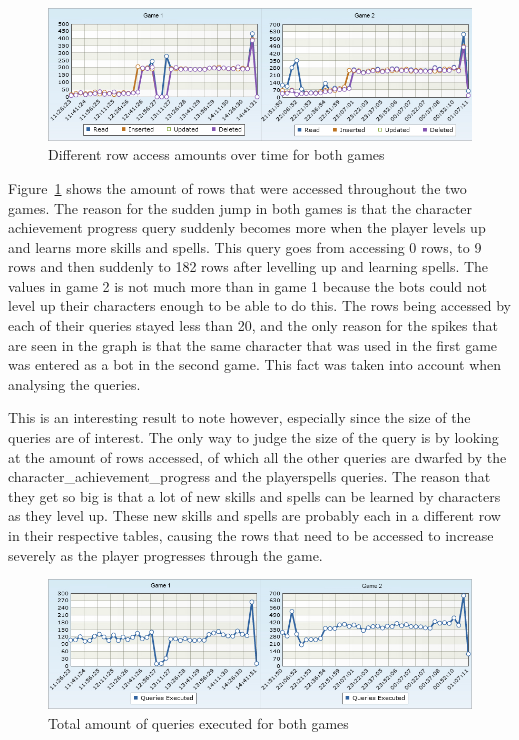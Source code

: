 \begin{figure}[htbp]
\centering
\includegraphics[scale = 0.75]{rowcomp.png}	
\caption{Different row access amounts over time for both games}
\label{rowaccess}
\end{figure}

Figure~\ref{rowaccess} shows the amount of rows that were accessed throughout the two games. The reason for the sudden jump in both games is that the character achievement progress query suddenly becomes more when the player levels up and learns more skills and spells. This query goes from accessing 0 rows, to 9 rows and then suddenly to 182 rows after levelling up and learning spells. The values in game 2 is not much more than in game 1 because the bots could not level up their characters enough to be able to do this. The rows being accessed by each of their queries stayed less than 20, and the only reason for the spikes that are seen in the graph is that the same character that was used in the first game was entered as a bot in the second game. This fact was taken into account when analysing the queries.

This is an interesting result to note however, especially since the size of the queries are of interest. The only way to judge the size of the query is by looking at the amount of rows accessed, of which all the other queries are dwarfed by the character\_achievement\_progress and the playerspells queries. The reason that they get so big is that a lot of new skills and spells can be learned by characters as they level up. These new skills and spells are probably each in a different row in their respective tables, causing the rows that need to be accessed to increase severely as the player progresses through the game.


\begin{figure}[htbp]
\centering
\includegraphics[scale = 0.75]{queriescomp.png}	
\caption{Total amount of queries executed for both games}
\label{totalqueries}
\end{figure}

